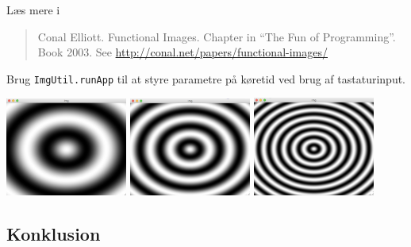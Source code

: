 \documentclass[rgb]{beamer}
\begin{document}
\begin{frame}[fragile]
\begin{footnotesize}


Læs mere i
\begin{quote}
  Conal Elliott. Functional Images. Chapter in ``The Fun of
  Programming''. Book 2003. See
  \url{http://conal.net/papers/functional-images/}
\end{quote}

\sp \sp
Brug \lstinline{ImgUtil.runApp} til at styre parametre på
  køretid ved brug af tastaturinput.

  \sp

  \sp

\includegraphics[width=0.30\textwidth]{../images/wav1.png}\hfill
\includegraphics[width=0.30\textwidth]{../images/wav2.png}\hfill
\includegraphics[width=0.30\textwidth]{../images/wav3.png}

\end{footnotesize}
\end{frame}

\subsection*{Konklusion}
\begin{frame}[fragile]

  \vspace{3mm}
  \tableofcontents
\end{frame}
\end{document}

